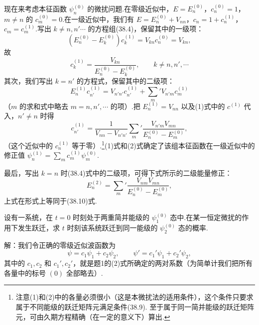 \begin{xiti}
现在来考虑本征函数 $\psi_n^{(0)}$ 的微扰问题.在零级近似中，$E=E_n^{(0)}$，$c_n^{(0)}=1$，$m\neq n$ 的 $c_m^{(0)}=0$.在一级近似中，我们有 $E=E_n^{(0)}+V_{nn}$，$c_n=1+c_n^{(1)}$，$c_m=c_m^{(1)}$.写出 $k\neq n,n'\cdots$ 的方程组(38.4)，保留其中的一级项：
\begin{equation*}
  \left(E_n^{(0)}-E_k^{(0)}\right)c_k^{(1)}=V_{kn}c_n^{(0)}=V_{kn},
\end{equation*}
故
\setcounter{equation}{0}%
\begin{equation}
  c_k^{(1)}=\frac{V_{kn}}{E_n^{(0)}-E_k^{(0)}},\qquad k\neq n,n',\cdots
\end{equation}
其次，我们写出 $k=n'$ 的方程式，保留其中的二级项：
\begin{equation*}
  E_n^{(1)}c_{n'}^{(1)}=V_{n'n'}c_{n'}^{(1)}+\sum_m{}'V_{n'm}c_m^{(1)}
\end{equation*}
（$m$ 的求和式中略去 $m=n,n',\cdots$ 的项）.把 $E_n^{(1)}=V_{nn}$ 以及(1)式中的 $c^{(1)}$ 代入，$n'\neq n$ 时得
\begin{equation}
  c_{n'}^{(1)}=\frac{1}{V_{nn}-V_{n'n'}}\sum_m{}'
  \frac{V_{n'm}V_{mn}}{E_n^{(0)}-E_m^{(0)}},
\end{equation}
（这个近似中的 $c_n^{(1)}$ 等于零）.\footnote{注意(1)和(2)中的各量必须很小（这是本微扰法的适用条件），这个条件只要求属于不同能级的跃迁矩阵元满足条件(38.9). 至于属于同一简并能级的跃迁矩阵元，可由久期方程精确（在一定的意义下）算出.}(1)式和(2)式确定了该组本征函数在一级近似中的修正值 $\psi_n^{(1)}=\sum_m c_m^{(1)}\psi_m^{(0)}$.

最后，写出 $k=n$ 时(38.4)式中的二级项，可得下式所示的二级能量修正：
\begin{equation}
  E_n^{(2)}=\sum_m{}'\frac{V_{nm}V_{mn}}{E_n^{(0)}-E_m^{(0)}},
\end{equation}
上式在形式上等同于(38.10)式.

\quad 设有一系统，在 $t=0$ 时刻处于两重简并能级的 $\psi_1^{(0)}$ 态中.在某一恒定微扰的作用下发生跃迁，求 $t$ 时刻该系统跃迁到同一能级的 $\psi_2^{(0)}$ 态的概率.

解：我们令正确的零级近似波函数为
\begin{equation*}
  \psi=c_1\psi_1+c_2\psi_2,\qquad \psi'=c_1'\psi_1+c_2'\psi_2,
\end{equation*}
其中的 $c_1,c_2$ 和 $c_1',c_2'$，就是题1的(2)式所确定的两对系数（为简单计我们把所有各量中的标号 $(0)$ 全部略去）.


\end{xiti}
